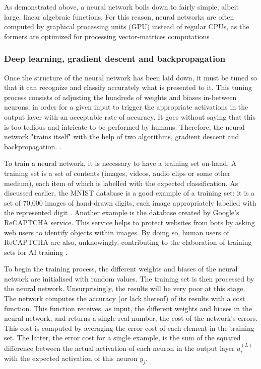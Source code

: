 \documentclass[12pt,a4paper,titlepage]{article}
\begin{document}
As demonstrated above, a neural network boils down to fairly simple, albeit large, linear algebraic functions. For this reason, neural networks are often computed by graphical processing units (GPU) instead of regular CPUs, as the formers are optimized for processing vector-matrices computations \cite{salter_cart_2022}.

\subsubsection{Deep learning, gradient descent and backpropagation}
Once the structure of the neural network has been laid down, it must be tuned so that it can recognize and classify accurately what is presented to it. This tuning process consists of adjusting the hundreds of weights and biases in-between neurons, in order for a given input to trigger the appropriate activations in the output layer with an acceptable rate of accuracy. It goes without saying that this is too tedious and intricate to be performed by humans. Therefore, the neural network "trains itself" with the help of two algorithms, gradient descent and backpropagation. \cite{ibm_cloud_education_what_2020}.

To train a neural network, it is necessary to have a training set on-hand. A training set is a set of contents (images, videos, audio clips or some other medium), each item of which is labelled with the expected classification. As discussed earlier, the MNIST database is a good example of a training set: it is a set of 70,000 images of hand-drawn digits, each image appropriately labelled with the represented digit \cite{lecun_mnist_1998}. Another example is the database created by Google's ReCAPTCHA service. This service helps to protect websites from bots by asking web users to identify objects within images. By doing so, human users of ReCAPTCHA are also, unknowingly, contributing to the elaboration of training sets for AI training \cite{maruzani_are_2021}.

To begin the training process, the different weights and biases of the neural network are initialised with random values. The training set is then processed by the neural network. Unsurprisingly, the results will be very poor at this stage. The network computes the accuracy (or lack thereof) of its results with a cost function. This function receives, as input, the different weights and biases in the neural network, and returns a single real number, the cost of the network's errors. This cost is computed by averaging the error cost of each element in the training set. The latter, the error cost for a single example, is the sum of the squared difference between the actual activation of each neuron in the output layer \(a_{i}^{(L)}\) with the expected activation of this neuron \(y_j\).
\end{document}
